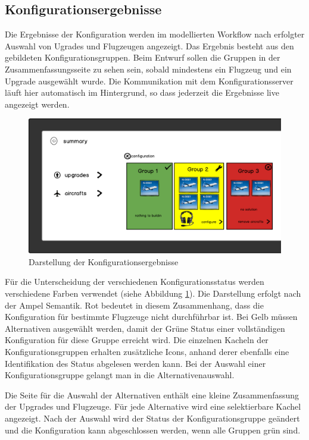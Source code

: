 \subsection{Konfigurationsergebnisse}
Die Ergebnisse der Konfiguration werden im modellierten Workflow nach erfolgter Auswahl von Ugrades und Flugzeugen angezeigt. Das Ergebnis besteht aus den gebildeten Konfigurationsgruppen. Beim Entwurf sollen die Gruppen in der Zusammenfassungsseite zu sehen sein, sobald mindestens ein Flugzeug und ein Upgrade ausgewählt wurde. Die Kommunikation mit dem Konfigurationsserver läuft hier automatisch im Hintergrund, so dass jederzeit die Ergebnisse live angezeigt werden. \par
\begin{figure}
\centering
\includegraphics[width=\hsize]{images/configuration_entwurf}
\caption{Darstellung der Konfigurationsergebnisse}
\label{confSketch}
\end{figure}
 Für die Unterscheidung der verschiedenen Konfigurationsstatus werden verschiedene Farben verwendet (siehe Abbildung \ref{confSketch}). Die Darstellung erfolgt nach der Ampel Semantik. Rot bedeutet in diesem Zusammenhang, dass die Konfiguration für bestimmte Flugzeuge nicht durchführbar ist. Bei Gelb müssen Alternativen ausgewählt werden, damit der Grüne Status einer vollständigen Konfiguration für diese Gruppe erreicht wird. Die einzelnen Kacheln der Konfigurationsgruppen erhalten zusätzliche Icons, anhand derer ebenfalls eine Identifikation des Status abgelesen werden kann. Bei der Auswahl einer Konfigurationsgruppe gelangt man in die Alternativenauswahl. \par
 
 Die Seite für die Auswahl der Alternativen enthält eine kleine Zusammenfassung der Upgrades und Flugzeuge. Für jede Alternative wird eine selektierbare Kachel angezeigt. Nach der Auswahl wird der Status der Konfigurationsgruppe geändert und die Konfiguration kann abgeschlossen werden, wenn alle Gruppen grün sind.

